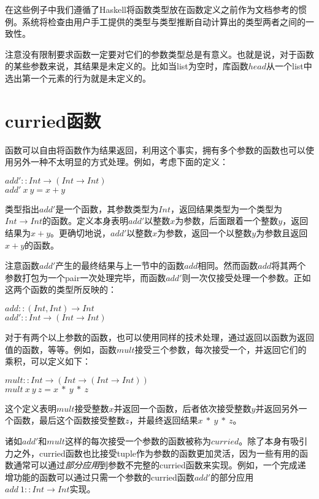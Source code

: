 在这些例子中我们遵循了Haskell将函数类型放在函数定义之前作为文档参考的惯例。系统将检查由用户手工提供的类型与类型推断自动计算出的类型两者之间的一致性。

注意没有限制要求函数一定要对它们的参数类型总是有意义。也就是说，对于函数的某些参数来说，其结果是未定义的。比如当list为空时，库函数$head$从一个list中选出第一个元素的行为就是未定义的。

\section{curried函数}
函数可以自由将函数作为结果返回，利用这个事实，拥有多个参数的函数也可以使用另外一种不太明显的方式处理。例如，考虑下面的定义：

\noindent\hspace*{1cm} $add' :: Int \rightarrow (Int \rightarrow Int)$\\
\hspace*{1cm} $add'~x~y = x + y$

类型指出$add'$是一个函数，其参数类型为$Int$，返回结果类型为一个类型为$Int
\rightarrow
Int$的函数。定义本身表明$add'$以整数$x$为参数，后面跟着一个整数$y$，返回结果为$x
+ y$。更确切地说，$add'$以整数$x$为参数，返回一个以整数$y$为参数且返回$x
+ y$的函数。

注意函数$add'$产生的最终结果与上一节中的函数$add$相同。然而函数$add$将其两个参数打包为一个pair一次处理完毕，而函数$add'$则一次仅接受处理一个参数。正如这两个函数的类型所反映的：

\noindent\hspace*{1cm} $add :: (Int, Int) \rightarrow Int$\\
\hspace*{1cm} $add' :: Int \rightarrow (Int \rightarrow Int)$

对于有两个以上参数的函数，也可以使用同样的技术处理，通过返回以函数为返回值的函数，等等。例如，函数$mult$接受三个参数，每次接受一个，并返回它们的乘积，可以定义如下：

\noindent\hspace*{1cm} $mult :: Int \rightarrow (Int \rightarrow (Int
\rightarrow Int))$\\
\hspace*{1cm} $mult~x~y~z = x~*~y~*~z$

这个定义表明$mult$接受整数$x$并返回一个函数，后者依次接受整数$y$并返回另外一个函数，最后这个函数接受整数$z$，并最终返回结果$x~*~y~*~z$。

诸如$add'$和$mult$这样的每次接受一个参数的函数被称为$curried$。除了本身有吸引力之外，curried函数也比接受tuple作为参数的函数更加灵活，因为一些有用的函数通常可以通过\textit{部分应用}到参数不完整的curried函数来实现。例如，一个完成递增功能的函数可以通过只需一个参数的curried函数$add'$的部分应用$add~1
:: Int \rightarrow Int$实现。

